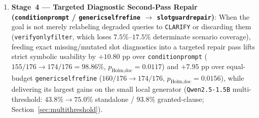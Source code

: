 \documentclass[10pt,twocolumn]{article}
\renewcommand{\_}{\textunderscore\allowbreak}
\begin{document}
\begin{enumerate}[leftmargin=*,nosep]
  \item \textbf{Stage~4 --- Targeted Diagnostic Second-Pass Repair (\texttt{condition\_prompt} / \texttt{generic\_self\_refine} $\to$ \texttt{slot\_guard\_repair})}: When the goal is not merely relabeling degraded queries to \texttt{CLARIFY} or discarding them (\texttt{verify\_only\_filter}, which loses $7.5\%\text{--}17.5\%$ determinate scenario coverage), feeding exact missing/mutated slot diagnostics into a targeted repair pass lifts strict symbolic usability by \textbf{$+10.80\text{ pp}$} over \texttt{condition\_prompt} ($155/176 \to 174/176 = 98.86\%$, $p_{\text{Holm,doc}} = 0.0117$) and \textbf{$+7.95\text{ pp}$} over equal-budget \texttt{generic\_self\_refine} ($160/176 \to 174/176$, $p_{\text{Holm,doc}} = 0.0156$), while delivering its largest gains on the small local generator (\texttt{Qwen2.5-1.5B} multi-threshold: $43.8\% \to 75.0\%$ standalone / $93.8\%$ granted-clause; Section~\ref{sec:multithreshold}).
\end{enumerate}
\end{document}
